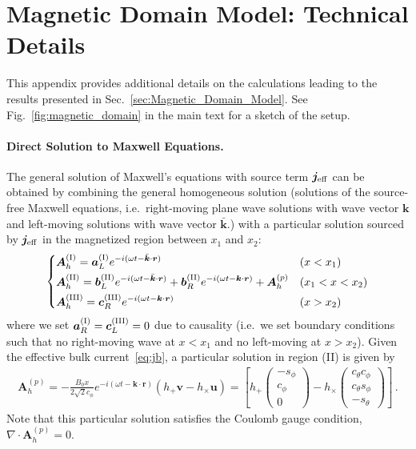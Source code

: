 \documentclass[a4paper,11pt]{article}
\begin{document}
\section{Magnetic Domain Model: Technical Details}
\label{app:Derivations of Magnetic Domain Wall Model}


This appendix provides additional details on the calculations leading to the results presented in Sec.~\ref{sec:Magnetic_Domain_Model}.
%
See Fig.~\ref{fig:magnetic_domain} in the main text for a sketch of the setup.

\paragraph{Direct Solution to Maxwell Equations.}
The general solution of Maxwell's equations with source term $ {\bm j}_{\rm eff}$ can be obtained by combining the general homogeneous solution (solutions of the source-free Maxwell equations, i.e.\ right-moving plane wave solutions with wave vector $ \bm{k}$ and left-moving solutions with wave vector $ \bar{\bm k}$.) with a particular solution sourced by $ {\bm j}_{\rm eff}$ in the magnetized region between $x_1$ and $x_2$:
%
\begin{align}
    \begin{dcases}
     \bm{A}_{h}^{\rm (I)} = \bm{a}^{\rm (I)}_{L} e^{ - i ( \omega t - \bar{\bm k} \cdot \bm{r} ) }   & (x < x_{1}) \\
     \bm{A}_{h}^{\rm (II)} = \bm{b}_{L}^{\rm (II)} e^{-i (\omega t - \bar{ \bm{k} } \cdot \bm{r} ) }  +\bm{b}_{R}^{\rm (II)} e^{-i (\omega t - \bm{k} \cdot \bm{r} )} +  \bm{A}_{h}^{(p)}  & (x_{1}  < x < x_{2} ) \\
      \bm{A}_{h}^{\rm (III)} = \bm{c}^{\rm (III)}_{R} e^{-i (\omega t - \bm{k} \cdot \bm{r} )}   & (x > x_{2})
    \end{dcases} \label{eq:general_solution}
\end{align}
%
where we set $ \bm{a}_{R}^{\rm (I)} = \bm{c}_{L}^{\rm (III)} = 0 $ due to causality (i.e.\ we set boundary conditions such that no right-moving wave at $ x < x_{1} $ and no left-moving at $ x > x_{2} $). Given the effective bulk current~\eqref{eq:jb}, a particular solution in region (II) is given by
\begin{align}
    {\bm A}_{h}^{(p)} =
   - \frac{ B_{0} x }{2\sqrt{2} c_{\phi}} 
    e^{- i (\omega t - \bm{k} \cdot {\bm r} )}
   ( h_{+} \bm{v} - h_{\times} \bm{u} )
   =  \left[ h_{+} \begin{pmatrix}
          - s_{\phi} \\
          c_{\phi} \\
          0
      \end{pmatrix} - h_{\times}
      \begin{pmatrix}
          c_{\theta} c_{\phi} \\
          c_{\theta} s_{\phi}\\
          -s_{\theta}
      \end{pmatrix}
      \right]
   \,.
\end{align}
%
Note that this particular solution satisfies the Coulomb gauge condition, $ \nabla \cdot \bm{A}_{h}^{(p)} = 0$.
\end{document}
